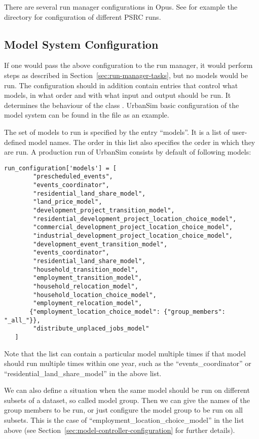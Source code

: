 There are several run manager \runmanagerindex configurations in Opus. See for example the
directory  for configuration of different PSRC \psrcindex runs.

\subsection{Model System Configuration}
\label{sec:model-system-configuration}
%
If one would pass the above configuration to the run manager, \runmanagerindex it would perform
steps as described in Section~\ref{sec:run-manager-tasks}, but no models \modelsindex would
be run. The configuration should in addition contain entries that control what
models, \modelsindex in what order and with what input and output should be run. It
determines the behaviour of the class . UrbanSim basic
configuration of the model \modelsindex system can be found in the file
 as an example.

The set of models \modelsindex to run is specified by the entry ``models''. \modelsindex It is a list of
user-defined model names. The order in this list also specifies the order in
which they are run. A production run of UrbanSim consists by default of
following models: \modelsindex
\begin{verbatim}
run_configuration['models'] = [
        "prescheduled_events",
        "events_coordinator",
        "residential_land_share_model",
        "land_price_model",
        "development_project_transition_model",
        "residential_development_project_location_choice_model",
        "commercial_development_project_location_choice_model",
        "industrial_development_project_location_choice_model",
        "development_event_transition_model",
        "events_coordinator",
        "residential_land_share_model",
        "household_transition_model",
        "employment_transition_model",
        "household_relocation_model",
        "household_location_choice_model",
        "employment_relocation_model", 
       {"employment_location_choice_model": {"group_members": "_all_"}},
        "distribute_unplaced_jobs_model"
   ]
\end{verbatim}
Note that the list can contain a particular model multiple times if that model should
run multiple times within one year, such as the ``events_coordinator'' or
``residential_land_share_model'' in the above list.

We can also define a situation when the same model should be run on different subsets of 
a dataset, so called model group. Then we can give the names of the group members to be run, or 
just configure the model group to be run on all subsets. This is the case of ``employment_location_choice_model''
in the list above (see Section~\ref{sec:model-controller-configuration} for further details).
 

